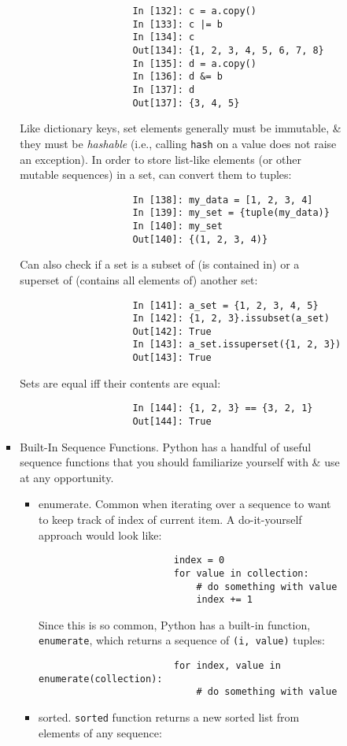 \documentclass{article}
\begin{document}
\begin{enumerate}
\begin{itemize}
\begin{itemize}
\begin{itemize}
\begin{verbatim}
					In [132]: c = a.copy()
					In [133]: c |= b
					In [134]: c
					Out[134]: {1, 2, 3, 4, 5, 6, 7, 8}
					In [135]: d = a.copy()
					In [136]: d &= b
					In [137]: d
					Out[137]: {3, 4, 5}
				\end{verbatim}
				Like dictionary keys, set elements generally must be immutable, \& they must be {\it hashable} (i.e., calling {\tt hash} on a value does not raise an exception). In order to store list-like elements (or other mutable sequences) in a set, can convert them to tuples:
				\begin{verbatim}
					In [138]: my_data = [1, 2, 3, 4]
					In [139]: my_set = {tuple(my_data)}
					In [140]: my_set
					Out[140]: {(1, 2, 3, 4)}
				\end{verbatim}
				Can also check if a set is a subset of (is contained in) or a superset of (contains all elements of) another set:
				\begin{verbatim}
					In [141]: a_set = {1, 2, 3, 4, 5}
					In [142]: {1, 2, 3}.issubset(a_set)
					Out[142]: True
					In [143]: a_set.issuperset({1, 2, 3})
					Out[143]: True
				\end{verbatim}
				Sets are equal iff their contents are equal:
				\begin{verbatim}
					In [144]: {1, 2, 3} == {3, 2, 1}
					Out[144]: True
				\end{verbatim}
				\item {\sf Built-In Sequence Functions.} Python has a handful of useful sequence functions that you should familiarize yourself with \& use at any opportunity.
				\begin{itemize}
					\item {\sf enumerate.} Common when iterating over a sequence to want to keep track of index of current item. A do-it-yourself approach would look like:
					\begin{verbatim}
						index = 0
						for value in collection:
						    # do something with value
						    index += 1
					\end{verbatim}
					Since this is so common, Python has a built-in function, {\tt enumerate}, which returns a sequence of {\tt(i, value)} tuples:
					\begin{verbatim}
						for index, value in enumerate(collection):
						    # do something with value
					\end{verbatim}
					\item {\sf sorted.} {\tt sorted} function returns a new sorted list from elements of any sequence:
					\begin{verbatim}

\end{verbatim}
\end{itemize}
\end{itemize}
\end{itemize}
\end{itemize}
\end{enumerate}
\end{document}
